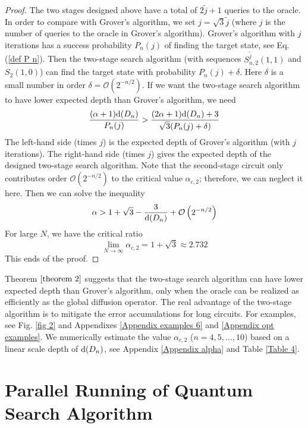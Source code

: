 \documentclass[%
 twocolumn,
 10pt,
 superscriptaddress,
 longbibliography,
 amsmath,amssymb,
 aps,
 pra,
floatfix,
]{revtex4-1}
\begin{document}
\begin{proof}
The two stages designed above have a total of $2\tilde j+1$ queries to the oracle. In order to compare with Grover's algorithm, we set $j=\sqrt 3 \tilde j$ (where $j$ is the number of queries to the oracle in Grover's algorithm). Grover's algorithm with $j$ iterations has a success probability $P_n(j)$ of finding the target state, see Eq. (\ref{def P n}). Then the two-stage search algorithm (with sequences $S^{\tilde j}_{n,2}(1,1)$ and $S_{2}(1,0)$) can find the target state with probability $P_n(j)+\delta$. Here $\delta$ is a small number in order $\delta = \mathcal O(2^{-n/2})$. If we want the two-stage search algorithm to have lower expected depth than Grover's algorithm, we need 
\begin{equation}
    \frac{(\alpha+1)\text d(D_n)}{P_n(j)}>\frac{(2\alpha+1)\text d(D_n)+3}{\sqrt 3(P_n(j)+\delta)}
\end{equation}
The left-hand side (times $j$) is the expected depth of Grover's algorithm (with $j$ iterations). The right-hand side (times $j$) gives the expected depth of the designed two-stage search algorithm. Note that the second-stage circuit only contributes order $\mathcal O(2^{-n/2})$ to the critical value $\alpha_{c,2}$; therefore, we can neglect it here. Then we can solve the inequality
\begin{equation}
    \alpha > 1+\sqrt 3 -\frac 3 {\text d(D_n)}+\mathcal O\left(2^{-n/2}\right)
\end{equation}
For large $N$, we have the critical ratio
\begin{equation}
    \lim_{N\rightarrow\infty}\alpha_{c,2} = 1+\sqrt 3 \approx 2.732
\end{equation}
This ends of the proof.
\end{proof}

Theorem $\ref{theorem 2}$ suggests that the two-stage search algorithm can have lower expected depth than Grover's algorithm, only when the oracle can be realized as efficiently as the global diffusion operator. The real advantage of the two-stage algorithm is to mitigate the error accumulations for long circuits. For examples, see Fig. \ref{fig 2} and Appendixes \ref{Appendix examples 6} and \ref{Appendix opt examples}. We numerically estimate the value $\alpha_{c,2}$ ($n=4,5,\ldots,10$) based on a linear scale depth of $\text d(D_n)$, see Appendix \ref{Appendix alpha} and Table \ref{Table 4}.


\section{\label{sec:parallel}Parallel Running of Quantum Search Algorithm}
\end{document}
